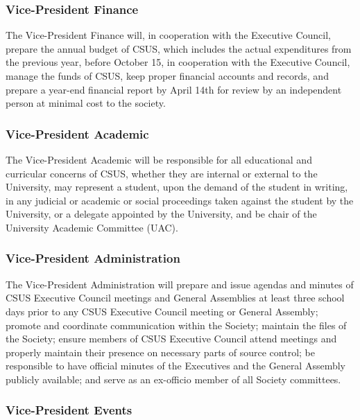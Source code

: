 \subsubsection{Vice-President Finance}\label{vice-president-finance}

The Vice-President Finance will, in cooperation with the Executive
Council, prepare the annual budget of CSUS, which includes the actual
expenditures from the previous year, before October 15, in cooperation
with the Executive Council, manage the funds of CSUS, keep proper
financial accounts and records, and prepare a year-end financial report
by April 14th for review by an independent person at minimal cost to the
society.

\subsubsection{Vice-President Academic}\label{vice-president-academic}

The Vice-President Academic will be responsible for all educational and
curricular concerns of CSUS, whether they are internal or external to
the University, may represent a student, upon the demand of the student
in writing, in any judicial or academic or social proceedings taken
against the student by the University, or a delegate appointed by the
University, and be chair of the University Academic Committee (UAC).

\subsubsection{Vice-President
Administration}\label{vice-president-administration}

The Vice-President Administration will prepare and issue agendas and
minutes of CSUS Executive Council meetings and General Assemblies at
least three school days prior to any CSUS Executive Council meeting or
General Assembly; promote and coordinate communication within the
Society; maintain the files of the Society; ensure members of CSUS
Executive Council attend meetings and properly maintain their presence
on necessary parts of source control; be responsible to have official
minutes of the Executives and the General Assembly publicly available;
and serve as an ex-officio member of all Society committees.

\subsubsection{Vice-President Events}\label{vice-president-events}

